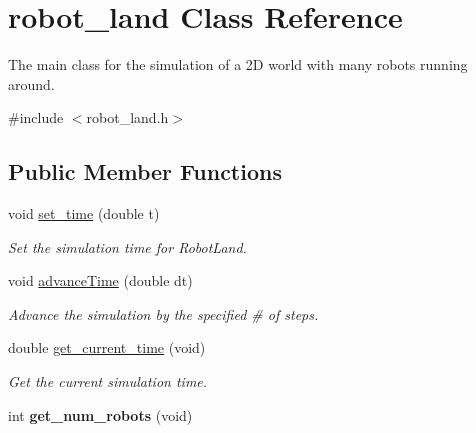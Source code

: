 \hypertarget{classrobot__land}{}\section{robot\+\_\+land Class Reference}
\label{classrobot__land}


The main class for the simulation of a 2D world with many robots running around.  




{\ttfamily \#include $<$robot\+\_\+land.\+h$>$}

\subsection*{Public Member Functions}
\begin{DoxyCompactItemize}
\item 
void \hyperlink{classrobot__land_a9b759efccbcae2be07ead240caec14cf}{set\+\_\+time} (double t)
\begin{DoxyCompactList}\small\item\em Set the simulation time for Robot\+Land. \end{DoxyCompactList}\item 
void \hyperlink{classrobot__land_af48446e7dafcf509fd3c13e66e17466b}{advance\+Time} (double dt)
\begin{DoxyCompactList}\small\item\em Advance the simulation by the specified \# of steps. \end{DoxyCompactList}\item 
double \hyperlink{classrobot__land_a9469257602322310502bfe0298bea0e4}{get\+\_\+current\+\_\+time} (void)\hypertarget{classrobot__land_a9469257602322310502bfe0298bea0e4}{}\label{classrobot__land_a9469257602322310502bfe0298bea0e4}

\begin{DoxyCompactList}\small\item\em Get the current simulation time. \end{DoxyCompactList}\item 
int {\bfseries get\+\_\+num\+\_\+robots} (void)\hypertarget{classrobot__land_a604710cec501348f61c009ed9066232e}{}\label{classrobot__land_a604710cec501348f61c009ed9066232e}


\end{DoxyCompactItemize}
